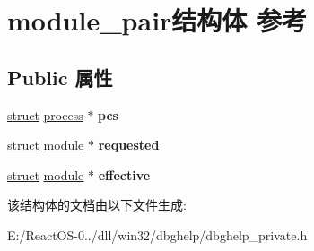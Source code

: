 \hypertarget{structmodule__pair}{}\section{module\+\_\+pair结构体 参考}
\label{structmodule__pair}
\subsection*{Public 属性}
\begin{DoxyCompactItemize}
\item 
\mbox{\label{structmodule__pair_a394a3f881ee1a9b135d4d8eddef1cfc0}} 
\hyperlink{interfacestruct}{struct} \hyperlink{structprocess}{process} $\ast$ {\bfseries pcs}
\item 
\mbox{\label{structmodule__pair_ac963e5a06ff4e145b147ddb98d5d4ee7}} 
\hyperlink{interfacestruct}{struct} \hyperlink{structmodule}{module} $\ast$ {\bfseries requested}
\item 
\mbox{\label{structmodule__pair_a750df94801223097e2329405db479b62}} 
\hyperlink{interfacestruct}{struct} \hyperlink{structmodule}{module} $\ast$ {\bfseries effective}
\end{DoxyCompactItemize}


该结构体的文档由以下文件生成\+:\begin{DoxyCompactItemize}
\item 
E\+:/\+React\+O\+S-\/0../dll/win32/dbghelp/dbghelp\+\_\+private.\+h\end{DoxyCompactItemize}
